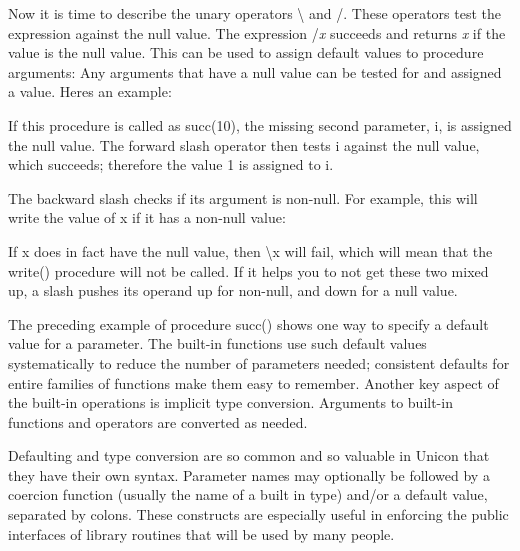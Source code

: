 Now it is time to describe the unary operators \textsf{{\textbackslash}}
and \textsf{/}. These operators test the expression against the null
value. The expression \textsf{/}\textsf{\textit{x}}
succeeds and returns \textsf{\textit{x}} if the value is the null
value. This can be used to assign default values to procedure
arguments: Any arguments that have a null value can be tested for and
assigned a value. Here{\textquotesingle}s an example:


If this procedure is called as \textsf{succ(10)}, the missing second
parameter, \textsf{i}, is assigned the null value. The forward slash
operator then tests \textsf{i} against the null value, which succeeds;
therefore the value 1 is assigned to \textsf{i}.

The backward slash checks if its argument is non-null. For example, this
will write the value of \textsf{x} if it has a non-null value:


If \textsf{x} does in fact have the null value, then \textsf{{\textbackslash}x} will fail, which will mean
that the \textsf{write()} procedure will not be called. If it helps you
to not get these two mixed up, a slash pushes its operand
{\textquotedbl}up{\textquotedbl} for non-null, and
{\textquotedbl}down{\textquotedbl} for a null value.

The preceding example of procedure \textsf{succ()} shows one way to
specify a default value for a parameter. The built-in functions use
such default values systematically to reduce the number of parameters
needed; consistent defaults for entire families of functions make them
easy to remember. Another key aspect of the built-in operations is
implicit type conversion. Arguments to built-in functions and operators
are converted as needed.

Defaulting and type
conversion are so common and so valuable in Unicon that they have their
own syntax. Parameter names may optionally be followed by a coercion
function (usually the name of a built in type) and/or a default value,
separated by colons. These constructs are especially useful in
enforcing the public interfaces of library routines that will be used
by many people.

